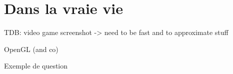 \documentclass[compress]{beamer}
\begin{document}

\section{Dans la vraie vie}

\begin{frame}{}
    TDB: video game screenshot
    -> need to be fast and to approximate stuff
\end{frame}

\begin{frame}{}
    OpenGL (and co)
\end{frame}


\begin{frame}{Exemple de question}
\end{frame}
\end{document}
